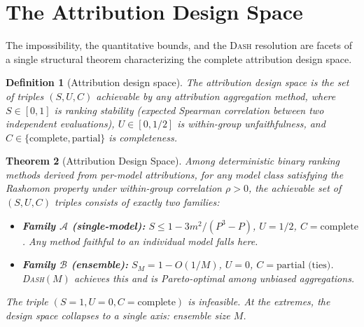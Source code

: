 \documentclass{article}
\newtheorem{theorem}{Theorem}
\newtheorem{definition}[theorem]{Definition}
\newcommand{\DASH}{\textsc{Dash}}
\begin{document}

\section{The Attribution Design Space}
\label{sec:design-space}

The impossibility, the quantitative bounds, and the \DASH{} resolution are facets of a single structural theorem characterizing the complete attribution design space.

\begin{definition}[Attribution design space]
\label{def:design-space-def}
The \emph{attribution design space} is the set of triples $(S, U, C)$ achievable by any attribution aggregation method, where $S \in [0,1]$ is ranking stability (expected Spearman correlation between two independent evaluations), $U \in [0, 1/2]$ is within-group unfaithfulness, and $C \in \{\text{complete}, \text{partial}\}$ is completeness.
\end{definition}

\begin{theorem}[Attribution Design Space]
\label{thm:design-space-main}
Among deterministic binary ranking methods derived from per-model attributions, for any model class satisfying the Rashomon property under within-group correlation $\rho > 0$, the achievable set of $(S, U, C)$ triples consists of exactly two families:
\begin{itemize}
    \item \textbf{Family $\mathcal{A}$ (single-model):} $S \leq 1 - 3m^2/(P^3{-}P)$, $U = 1/2$, $C = \text{complete}$. Any method faithful to an individual model falls here.
    \item \textbf{Family $\mathcal{B}$ (ensemble):} $S_M = 1 - O(1/M)$, $U = 0$, $C = \text{partial (ties)}$. \DASH{}$(M)$ achieves this and is Pareto-optimal among unbiased aggregations.
\end{itemize}
The triple $(S{=}1, U{=}0, C{=}\text{complete})$ is infeasible. At the extremes, the design space collapses to a single axis: ensemble size $M$.
\end{theorem}
\end{document}
